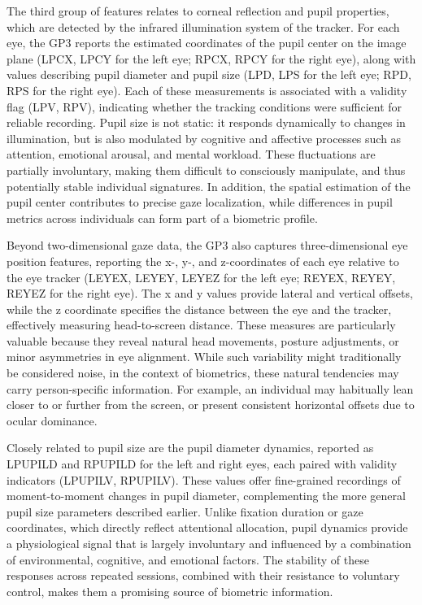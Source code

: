 \documentclass{article}
\begin{document}
The third group of features relates to corneal reflection and pupil properties, which are detected by the infrared illumination system of the tracker. 
For each eye, the GP3 reports the estimated coordinates of the pupil center on the image plane (LPCX, LPCY for the left eye; RPCX, RPCY for the right eye), along with values describing pupil diameter and pupil size (LPD, LPS for the left eye; RPD, RPS for the right eye). 
Each of these measurements is associated with a validity flag (LPV, RPV), indicating whether the tracking conditions were sufficient for reliable recording. 
Pupil size is not static: it responds dynamically to changes in illumination, but is also modulated by cognitive and affective processes such as attention, emotional arousal, and mental workload. 
These fluctuations are partially involuntary, making them difficult to consciously manipulate, and thus potentially stable individual signatures. 
In addition, the spatial estimation of the pupil center contributes to precise gaze localization, while differences in pupil metrics across individuals can form part of a biometric profile.

Beyond two-dimensional gaze data, the GP3 also captures three-dimensional eye position features, reporting the x-, y-, and z-coordinates of each eye relative to the eye tracker (LEYEX, LEYEY, LEYEZ for the left eye; REYEX, REYEY, REYEZ for the right eye). 
The x and y values provide lateral and vertical offsets, while the z coordinate specifies the distance between the eye and the tracker, effectively measuring head-to-screen distance. 
These measures are particularly valuable because they reveal natural head movements, posture adjustments, or minor asymmetries in eye alignment. 
While such variability might traditionally be considered noise, in the context of biometrics, these natural tendencies may carry person-specific information. 
For example, an individual may habitually lean closer to or further from the screen, or present consistent horizontal offsets due to ocular dominance.

Closely related to pupil size are the pupil diameter dynamics, reported as LPUPILD and RPUPILD for the left and right eyes, each paired with validity indicators (LPUPILV, RPUPILV). 
These values offer fine-grained recordings of moment-to-moment changes in pupil diameter, complementing the more general pupil size parameters described earlier. 
Unlike fixation duration or gaze coordinates, which directly reflect attentional allocation, pupil dynamics provide a physiological signal that is largely involuntary and influenced by a combination of environmental, cognitive, and emotional factors.
The stability of these responses across repeated sessions, combined with their resistance to voluntary control, makes them a promising source of biometric information.
\end{document}
